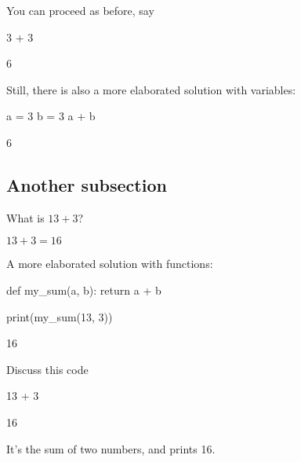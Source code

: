 \documentclass{book}
\begin{document}
\begin{additionalinformation}
You can proceed as before, say
\begin{pycell}
3 + 3
\end{pycell}
\begin{pyexpectedoutput}
6
\end{pyexpectedoutput}

Still, there is also a more elaborated solution with variables:

\begin{pycell}
a = 3
b = 3
a + b
\end{pycell}
\begin{pyexpectedoutput}
6
\end{pyexpectedoutput}
\end{additionalinformation}

\subsection{Another subsection}

\begin{exercise}
  What is \(13 + 3\)?
\end{exercise}

\begin{solution}
  \(13 + 3 = 16\)
\end{solution}

\begin{additionalinformation}
A more elaborated solution with functions:

\begin{pycell}
def my_sum(a, b):
    return a + b

print(my_sum(13, 3))
\end{pycell}
\begin{pyexpectedoutput}
16
\end{pyexpectedoutput}
\end{additionalinformation}

\begin{exercise}
Discuss this code

\begin{pycell}
13 + 3
\end{pycell}
\begin{pyexpectedoutput}
16
\end{pyexpectedoutput}
\end{exercise}

\begin{solution}
It's the sum of two numbers, and prints 16.
\end{solution}
\end{document}
